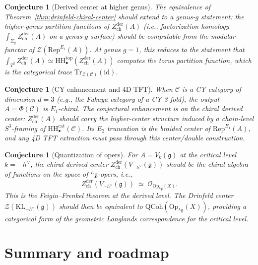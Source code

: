 \documentclass[11pt]{article}
\newtheorem{conjecture}[theorem]{Conjecture}
\theoremstyle{definition}
\theoremstyle{remark}
\newcommand{\Rep}{\mathrm{Rep}}
\newcommand{\HH}{\mathrm{HH}}
\newcommand{\Tr}{\mathrm{Tr}}
\newcommand{\id}{\mathrm{id}}
\newcommand{\cC}{\mathcal{C}}
\newcommand{\cO}{\mathcal{O}}
\newcommand{\cZ}{\mathcal{Z}}
\newcommand{\frakg}{\mathfrak{g}}
\newcommand{\KL}{\mathrm{KL}}
\newcommand{\Zder}{Z^{\mathrm{der}}_{\mathrm{ch}}}
\begin{document}
\begin{conjecture}[Derived center at higher genus]
\label{conj:higher-genus}
The equivalence of Theorem~\ref{thm:drinfeld-chiral-center} should extend to a genus-$g$ statement: the higher-genus partition functions of $\Zder(A)$ (i.e., factorization homology $\int_{\Sigma_g} \Zder(A)$ on a genus-$g$ surface) should be computable from the modular functor of $\cZ(\Rep^{E_1}(A))$. At genus $g = 1$, this reduces to the statement that $\int_{T^2} \Zder(A) \simeq \HH^{\mathrm{top}}_\bullet(\Zder(A))$ computes the torus partition function, which is the categorical trace $\Tr_{\cZ(\cC)}(\id)$.
\end{conjecture}

\begin{conjecture}[CY enhancement and 4D TFT]
\label{conj:cy-4d}
When $\cC$ is a CY category of dimension $d = 3$ (e.g., the Fukaya category of a CY 3-fold), the output $A = \Phi(\cC)$ is $E_1$-chiral. The conjectural enhancement is on the chiral derived center: $\Zder(A)$ should carry the higher-center structure induced by a chain-level $S^3$-framing of $\HH^{\mathrm{cat}}_\bullet(\cC)$. Its $E_2$ truncation is the braided center of $\Rep^{E_1}(A)$, and any 4D TFT extraction must pass through this center/double construction.
\end{conjecture}

\begin{conjecture}[Quantization of opers]
\label{conj:opers}
For $A = V_k(\frakg)$ at the critical level $k = -h^\vee$, the chiral derived center $\Zder(V_{-h^\vee}(\frakg))$ should be the chiral algebra of functions on the space of ${}^L\frakg$-opers, i.e.,
\[
 \Zder(V_{-h^\vee}(\frakg)) \;\simeq\; \cO_{\mathrm{Op}_{{}^L\!\frakg}(X)}.
\]
This is the Feigin--Frenkel theorem at the derived level. The Drinfeld center $\cZ(\KL_{-h^\vee}(\frakg))$ should then be equivalent to $\mathrm{QCoh}(\mathrm{Op}_{{}^L\!\frakg}(X))$, providing a categorical form of the geometric Langlands correspondence for the critical level.
\end{conjecture}


\section{Summary and roadmap}
\label{sec:summary}
\end{document}
